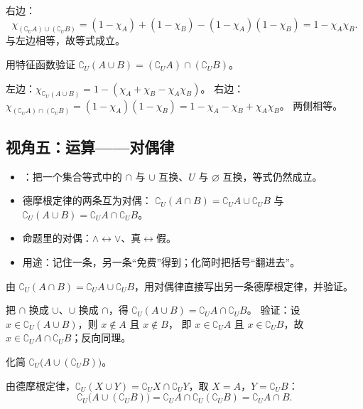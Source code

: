 \begin{explore}
\begin{solution}
右边：
\[
  \chi_{(\complement_U A)\cup(\complement_U B)}
  =(1-\chi_A)+(1-\chi_B)-(1-\chi_A)(1-\chi_B)
  =1-\chi_A\chi_B.
\]
与左边相等，故等式成立。
\end{solution}

\begin{problem}
用特征函数验证 $\complement_U(A\cup B)=(\complement_U A)\cap(\complement_U B)$。
\end{problem}
\begin{solution}
左边：$\chi_{\complement_U(A\cup B)}=1-(\chi_A+\chi_B-\chi_A\chi_B)$。
右边：$\chi_{(\complement_U A)\cap(\complement_U B)}=(1-\chi_A)(1-\chi_B)=1-\chi_A-\chi_B+\chi_A\chi_B$。
两侧相等。
\end{solution}

\subsection{视角五：运算——对偶律}

\begin{itemize}
  \item {}：把一个集合等式中的 $\cap$ 与 $\cup$ 互换、$U$ 与 $\varnothing$ 互换，等式仍然成立。
  \item 德摩根定律的两条互为对偶：
  $\complement_U(A\cap B)=\complement_U A\cup\complement_U B$ 与 $\complement_U(A\cup B)=\complement_U A\cap\complement_U B$。
  \item 命题里的对偶：$\land\leftrightarrow\lor$、真$\leftrightarrow$假。
  \item 用途：记住一条，另一条“免费”得到；化简时把括号“翻进去”。
\end{itemize}

\begin{example}
由 $\complement_U(A\cap B)=\complement_U A\cup\complement_U B$，用对偶律直接写出另一条德摩根定律，并验证。
\end{example}
\begin{solution}
把 $\cap$ 换成 $\cup$、$\cup$ 换成 $\cap$，得
$\complement_U(A\cup B)=\complement_U A\cap\complement_U B$。
验证：设 $x\in\complement_U(A\cup B)$，则 $x\notin A$ 且 $x\notin B$，
即 $x\in\complement_U A$ 且 $x\in\complement_U B$，故 $x\in\complement_U A\cap\complement_U B$；反向同理。
\end{solution}

\begin{problem}
化简 $\complement_U\big(A\cup(\complement_U B)\big)$。
\end{problem}
\begin{solution}
由德摩根定律，$\complement_U(X\cup Y)=\complement_U X\cap\complement_U Y$，取 $X=A$，$Y=\complement_U B$：
\[
  \complement_U\big(A\cup(\complement_U B)\big)
  =\complement_U A\cap\complement_U(\complement_U B)
  =\complement_U A\cap B.
\]
\end{solution}


\end{explore}
